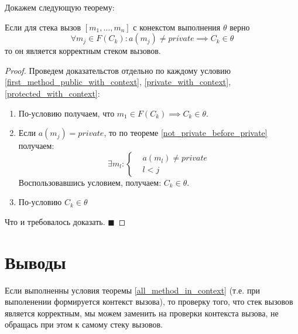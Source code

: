 \documentclass[graybox]{svmult}
\begin{document}
Докажем следующую теорему:
\begin{theorem}
\label{all_method_in_context}
Если для стека вызов $[m_1, \dots, m_n]$ с конекстом выполнения $\theta$ верно
\begin{equation}
\forall m_j \in F(C_k): a(m_j) \neq private \implies C_k \in \theta
\end{equation}
то он является корректным стеком вызовов.
\end{theorem}
\begin{proof}
Проведем доказательстов отдельно по каждому условию \ref{first_method_public_with_context}, \ref{private_with_context}, \ref{protected_with_context}:
\begin{enumerate}
\item По-условию получаем, что $m_1 \in F(C_k) \implies C_k \in \theta$.
\item Если $a(m_j) = private$, то по теореме \ref{not_private_before_private} получаем: 
\begin{equation*}
\exists m_l: \left\{ 
	\begin{aligned}
		&a(m_l) \neq private \\
		&l < j
	\end{aligned}
\right.
\end{equation*}
Воспользовавшись условием, получаем: $C_k \in \theta$.
\item По-условию $C_k \in \theta$
\end{enumerate}
Что и требовалось доказать. $\blacksquare$
\end{proof}

\section{Выводы}
\label{sec:3}
Если выполненны условия теоремы \ref{all_method_in_context} (т.е. при выполенении формируется контекст вызова), то проверку того, что стек вызовов является корректным, мы можем заменить на проверки контекста вызова, не обращась при этом к самому стеку вызовов.
\end{document}
